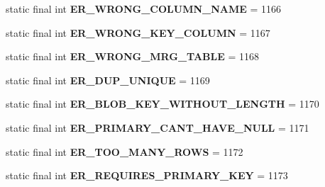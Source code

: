 \begin{DoxyCompactItemize}
static final int {\bfseries E\+R\+\_\+\+W\+R\+O\+N\+G\+\_\+\+C\+O\+L\+U\+M\+N\+\_\+\+N\+A\+ME} = 1166
\item 
\mbox{\label{classcom_1_1mysql_1_1cj_1_1exceptions_1_1_mysql_error_numbers_ad9d3b723ff8114481041cd0f4a617a2c}} 
static final int {\bfseries E\+R\+\_\+\+W\+R\+O\+N\+G\+\_\+\+K\+E\+Y\+\_\+\+C\+O\+L\+U\+MN} = 1167
\item 
\mbox{\label{classcom_1_1mysql_1_1cj_1_1exceptions_1_1_mysql_error_numbers_a9406991a629e9a99be93039bfd6036a7}} 
static final int {\bfseries E\+R\+\_\+\+W\+R\+O\+N\+G\+\_\+\+M\+R\+G\+\_\+\+T\+A\+B\+LE} = 1168
\item 
\mbox{\label{classcom_1_1mysql_1_1cj_1_1exceptions_1_1_mysql_error_numbers_a56c2357443e0452590630594f0732578}} 
static final int {\bfseries E\+R\+\_\+\+D\+U\+P\+\_\+\+U\+N\+I\+Q\+UE} = 1169
\item 
\mbox{\label{classcom_1_1mysql_1_1cj_1_1exceptions_1_1_mysql_error_numbers_adb7a74a05e32ea76bb568827a0139f40}} 
static final int {\bfseries E\+R\+\_\+\+B\+L\+O\+B\+\_\+\+K\+E\+Y\+\_\+\+W\+I\+T\+H\+O\+U\+T\+\_\+\+L\+E\+N\+G\+TH} = 1170
\item 
\mbox{\label{classcom_1_1mysql_1_1cj_1_1exceptions_1_1_mysql_error_numbers_a34b44e13733adbd03dd011f3fdd7127e}} 
static final int {\bfseries E\+R\+\_\+\+P\+R\+I\+M\+A\+R\+Y\+\_\+\+C\+A\+N\+T\+\_\+\+H\+A\+V\+E\+\_\+\+N\+U\+LL} = 1171
\item 
\mbox{\label{classcom_1_1mysql_1_1cj_1_1exceptions_1_1_mysql_error_numbers_aa57e0e5ecbd4dc4ee3785edba697cefb}} 
static final int {\bfseries E\+R\+\_\+\+T\+O\+O\+\_\+\+M\+A\+N\+Y\+\_\+\+R\+O\+WS} = 1172
\item 
\mbox{\label{classcom_1_1mysql_1_1cj_1_1exceptions_1_1_mysql_error_numbers_a02d9bbad1c6f46a5709cfd45677b4373}} 
static final int {\bfseries E\+R\+\_\+\+R\+E\+Q\+U\+I\+R\+E\+S\+\_\+\+P\+R\+I\+M\+A\+R\+Y\+\_\+\+K\+EY} = 1173

\end{DoxyCompactItemize}

